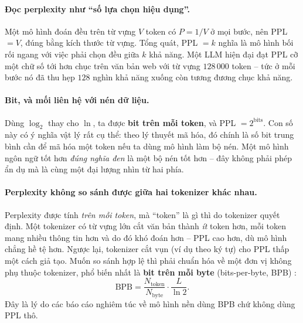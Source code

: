 \paragraph{Đọc perplexity như “số lựa chọn hiệu dụng”.} Một mô hình đoán đều trên từ vựng $V$ token có $P = 1/V$ ở mọi bước, nên PPL $= V$, đúng bằng kích thước từ vựng. Tổng quát, PPL $= k$ nghĩa là mô hình bối rối ngang với việc phải chọn đều giữa $k$ khả năng. Một LLM hiện đại đạt PPL cỡ một chữ số tới hơn chục trên văn bản web với từ vựng $128\,000$ token -- tức ở mỗi bước nó đã thu hẹp $128$ nghìn khả năng xuống còn tương đương chục khả năng.

\paragraph{Bit, và mối liên hệ với nén dữ liệu.} Dùng $\log_2$ thay cho $\ln$, ta được \textbf{bit trên mỗi token}, và PPL $= 2^{\text{bits}}$. Con số này có ý nghĩa vật lý rất cụ thể: theo lý thuyết mã hóa, đó chính là số bit trung bình cần để mã hóa một token nếu ta dùng mô hình làm bộ nén. Một mô hình ngôn ngữ tốt hơn \emph{đúng nghĩa đen} là một bộ nén tốt hơn -- đây không phải phép ẩn dụ mà là cùng một đại lượng nhìn từ hai phía.

\paragraph{Perplexity không so sánh được giữa hai tokenizer khác nhau.} Perplexity được tính \emph{trên mỗi token}, mà “token” là gì thì do tokenizer quyết định. Một tokenizer có từ vựng lớn cắt văn bản thành \emph{ít} token hơn, mỗi token mang nhiều thông tin hơn và do đó khó đoán hơn -- PPL cao hơn, dù mô hình chẳng hề tệ hơn. Ngược lại, tokenizer cắt vụn (ví dụ theo ký tự) cho PPL thấp một cách giả tạo. Muốn so sánh hợp lệ thì phải chuẩn hóa về một đơn vị không phụ thuộc tokenizer, phổ biến nhất là \textbf{bit trên mỗi byte} (bits-per-byte, BPB) \cite{gao2020pile}:
\[
\text{BPB} = \frac{N_{\text{token}}}{N_{\text{byte}}} \cdot \frac{L}{\ln 2} .
\]
Đây là lý do các báo cáo nghiêm túc về mô hình nền dùng BPB chứ không dùng PPL thô.

